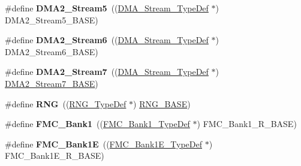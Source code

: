 \begin{DoxyCompactItemize}
\item 
\mbox{\label{group___peripheral__declaration_gac40f58718761251875b5a897287efd83}} 
\#define {\bfseries D\+M\+A2\+\_\+\+Stream5}~((\mbox{\hyperlink{struct_d_m_a___stream___type_def}{D\+M\+A\+\_\+\+Stream\+\_\+\+Type\+Def}} $\ast$) D\+M\+A2\+\_\+\+Stream5\+\_\+\+B\+A\+SE)
\item 
\mbox{\label{group___peripheral__declaration_ga11a00b283e0911cd427e277e5a314ccc}} 
\#define {\bfseries D\+M\+A2\+\_\+\+Stream6}~((\mbox{\hyperlink{struct_d_m_a___stream___type_def}{D\+M\+A\+\_\+\+Stream\+\_\+\+Type\+Def}} $\ast$) D\+M\+A2\+\_\+\+Stream6\+\_\+\+B\+A\+SE)
\item 
\mbox{\label{group___peripheral__declaration_gacc135dbca0eca67d5aa0abc555f053ce}} 
\#define {\bfseries D\+M\+A2\+\_\+\+Stream7}~((\mbox{\hyperlink{struct_d_m_a___stream___type_def}{D\+M\+A\+\_\+\+Stream\+\_\+\+Type\+Def}} $\ast$) \mbox{\hyperlink{group___peripheral__memory__map_gaa9faa708ad2440d24eb1064cba9bb06d}{D\+M\+A2\+\_\+\+Stream7\+\_\+\+B\+A\+SE}})
\item 
\mbox{\label{group___peripheral__declaration_ga5b0885b8b55bbc13691092b704d9309f}} 
\#define {\bfseries R\+NG}~((\mbox{\hyperlink{struct_r_n_g___type_def}{R\+N\+G\+\_\+\+Type\+Def}} $\ast$) \mbox{\hyperlink{group___peripheral__memory__map_gab92662976cfe62457141e5b4f83d541c}{R\+N\+G\+\_\+\+B\+A\+SE}})
\item 
\mbox{\label{group___peripheral__declaration_gadbd2f968da05cf7bb497d2ce38ae88b6}} 
\#define {\bfseries F\+M\+C\+\_\+\+Bank1}~((\mbox{\hyperlink{struct_f_m_c___bank1___type_def}{F\+M\+C\+\_\+\+Bank1\+\_\+\+Type\+Def}} $\ast$) F\+M\+C\+\_\+\+Bank1\+\_\+\+R\+\_\+\+B\+A\+SE)
\item 
\mbox{\label{group___peripheral__declaration_ga91eebdd476549799293eaa7a166a3cb3}} 
\#define {\bfseries F\+M\+C\+\_\+\+Bank1E}~((\mbox{\hyperlink{struct_f_m_c___bank1_e___type_def}{F\+M\+C\+\_\+\+Bank1\+E\+\_\+\+Type\+Def}} $\ast$) F\+M\+C\+\_\+\+Bank1\+E\+\_\+\+R\+\_\+\+B\+A\+SE)
\item 
\mbox{\label{group___peripheral__declaration_ga208aba2ade94120efe3b94348e980890}} 

\end{DoxyCompactItemize}
